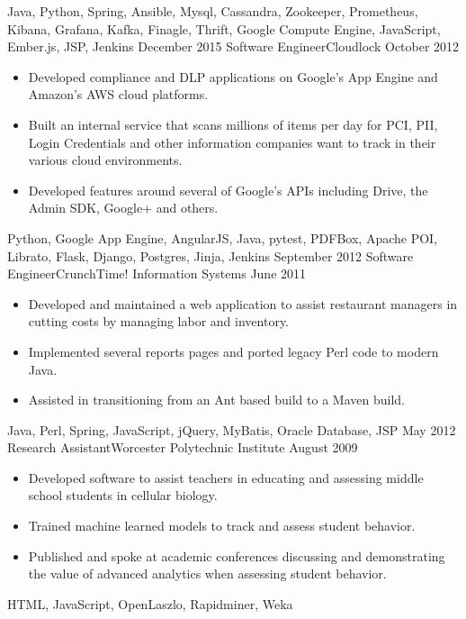 \begin{experiences}
{\begin{itemize}
                      \end{itemize}
                  }
                  {Java, Python, Spring, Ansible, Mysql, Cassandra, Zookeeper, Prometheus, Kibana, Grafana, Kafka, Finagle, Thrift, Google Compute Engine, JavaScript, Ember.js, JSP, Jenkins}
\emptySeparator
  \experience
  {December 2015}  {Software Engineer}{Cloudlock}
  {October 2012}   {
                      \begin{itemize}
                        \item Developed compliance and DLP applications on Google's App Engine and Amazon's AWS cloud platforms.
                        \item Built an internal service that scans millions of items per day for PCI, PII, Login Credentials and other information companies want to track in their various cloud environments.
                        \item Developed features around several of Google's APIs including Drive, the Admin SDK, Google+ and others.
                      \end{itemize}
                  }
                  {Python, Google App Engine, AngularJS, Java, pytest, PDFBox, Apache POI, Librato, Flask, Django, Postgres, Jinja, Jenkins}
\emptySeparator
  \experience
  {September 2012}  {Software Engineer}{CrunchTime! Information Systems}
  {June 2011}   {
                      \begin{itemize}
                        \item Developed and maintained a web application to assist restaurant managers in cutting costs by managing labor and inventory.
                        \item Implemented several reports pages and ported legacy Perl code to modern Java.   
                        \item Assisted in transitioning from an Ant based build to a Maven build.
                      \end{itemize}
                  }
                  {Java, Perl, Spring, JavaScript, jQuery, MyBatis, Oracle Database, JSP}
\emptySeparator
\experience
  {May 2012}  {Research Assistant}{Worcester Polytechnic Institute}
  {August 2009}   {
                      \begin{itemize}
                        \item Developed software to assist teachers in educating and assessing middle school students in cellular biology.                                          
                        \item Trained machine learned models to track and assess student behavior.    
                        \item Published and spoke at academic conferences discussing and demonstrating the value of advanced analytics when assessing student behavior.
                      \end{itemize}
                  }
                  {HTML, JavaScript, OpenLaszlo, Rapidminer, Weka}  
\end{experiences}
